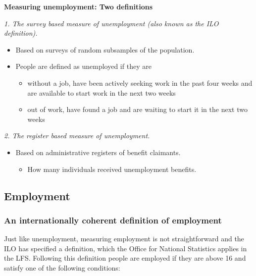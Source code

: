 \documentclass[]{book}
\providecommand{\tightlist}{%
  \setlength{\itemsep}{0pt}\setlength{\parskip}{0pt}}
\newenvironment{myblock}%
{%
 \begin{tcolorbox}%
}%
{\end{tcolorbox}}%
\begin{document}
\begin{myblock}
\textbf{Measuring unemployment: Two definitions}

\emph{1. The survey based measure of unemployment (also known as the ILO
definition).}

\begin{itemize}
\item
  Based on surveys of random subsamples of the population.
\item
  People are defined as unemployed if they are

  \begin{itemize}
  \tightlist
  \item
    without a job, have been actively seeking work in the past four
    weeks and are available to start work in the next two weeks
  \item
    out of work, have found a job and are waiting to start it in the
    next two weeks
  \end{itemize}
\end{itemize}

\emph{2. The register based measure of unemployment.}

\begin{itemize}
\tightlist
\item
  Based on administrative registers of benefit claimants.

  \begin{itemize}
  \tightlist
  \item
    How many individuals received unemployment benefits.
  \end{itemize}
\end{itemize}
\end{myblock}

\hypertarget{employment}{%
\subsection{Employment}\label{employment}}

\hypertarget{an-internationally-coherent-definition-of-employment}{%
\subsubsection{An internationally coherent definition of employment}\label{an-internationally-coherent-definition-of-employment}}

Just like unemployment, measuring employment is not straightforward and the ILO has specified a definition, which the Office for National Statistics applies in the LFS. Following this definition people are employed if they are above 16 and satisfy one of the following conditions:
\end{document}

